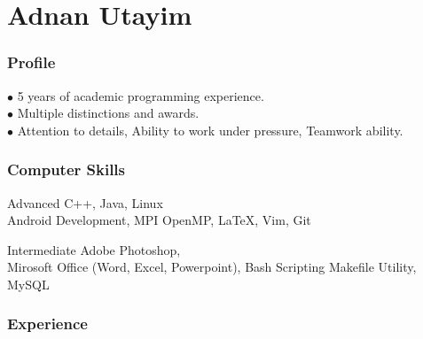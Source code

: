 \documentclass{tccv}
\begin{document}
\part{Adnan Utayim}


\section{Profile}
$\bullet$ 5 years of academic programming experience. \\
$\bullet$ Multiple distinctions and awards. \\
$\bullet$ Attention to details, Ability to work under pressure, Teamwork ability.


\section{Computer Skills}

\begin{factlist}

\item{Advanced}
     {C++, Java, Linux \\Android Development, MPI OpenMP, \LaTeX, Vim, Git}


\item{Intermediate}
     {Adobe Photoshop,\\ Mirosoft Office (Word, Excel, Powerpoint), Bash Scripting Makefile Utility, MySQL}

\end{factlist}


\section{Experience}
\end{document}
